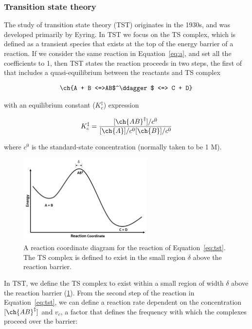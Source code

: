 \subsubsection{Transition state theory}

The study of transition state theory (TST) originates in the 1930s, and was
developed primarily by Eyring.\cite{McQuarrie1997,Steinfeld1998} In TST we
focus on the TS complex, which is defined as a transient species that exists
at the top of the energy barrier of a reaction. If we consider the same
reaction in Equation~\ref{eq:a}, and set all the coefficients to 1, then TST
states the reaction proceeds in two steps, the first of that includes a
quasi-equilibrium between the reactants and TS complex

\begin{equation}
  \ch{A + B <=>AB$^\ddagger$ <=> C + D}
  \label{eq:tst}
\end{equation}

\noindent with an equilibrium constant ($K_c^{\ddagger}$) expression

\begin{equation}
  K_c^{\ddagger} = \frac{[\ch{AB}^\ddagger]/c^0}{[\ch{A}]/c^0[\ch{B}]/c^0}
\label{eq:K}
\end{equation}

\noindent where $c^0$ is the standard-state concentration (normally taken to be
1 M).

\begin{figure}[htb]
    \centering
    \includegraphics[width=0.6\textwidth]{figures/TST-PES.png}
    \caption[A reaction coordinate diagram for a generic reaction.]{A reaction coordinate diagram for the reaction of Equation~\ref{eq:tst}. The TS complex is defined to exist in the small region $\delta$ above the reaction barrier.}
\label{fig:tst-pes}
\end{figure}

In TST, we define the TS complex to exist within a small region of width
$\delta$ above the reaction barrier (\ref{fig:tst-pes}). From the second step of
the reaction in Equation~\ref{eq:tst}, we can define a reaction rate dependent
on the concentration $[\ch{AB}^\ddagger]$ and $v_c$, a factor that defines the
frequency with which the complexes proceed over the barrier:

